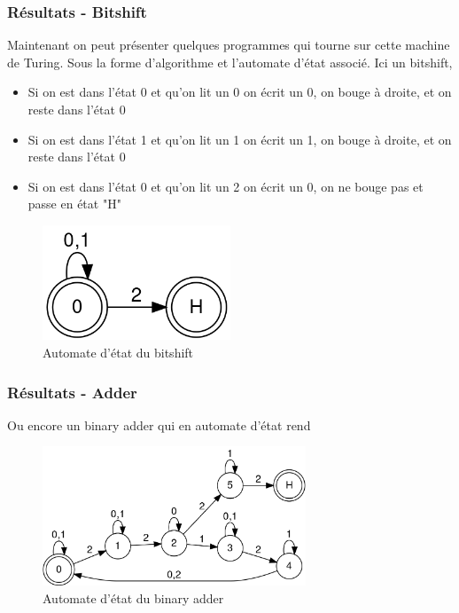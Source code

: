 \documentclass{beamer}
\begin{document}
    \begin{frame}
        \frametitle{Résultats - Bitshift}
        Maintenant on peut présenter quelques programmes qui tourne sur cette machine de Turing. Sous la forme d'algorithme et l'automate 
        d'état associé. Ici un bitshift,
        \begin{itemize}
            \item<1> Si on est dans l'état 0 et qu'on lit un 0 on écrit un 0, on bouge à droite, et on reste dans l'état 0
            \item<2> Si on est dans l'état 1 et qu'on lit un 1 on écrit un 1, on bouge à droite, et on reste dans l'état 0
            \item<3> Si on est dans l'état 0 et qu'on lit un 2 on écrit un 0, on ne bouge pas et passe en état "H"
        \end{itemize}
        \begin{figure}[H]
            \center
            \includegraphics[width=0.5\textwidth]{img/automata1.png}
            \caption{Automate d'état du bitshift}
        \end{figure}
    \end{frame}
    \begin{frame}
        \frametitle{Résultats - Adder}
        Ou encore un binary adder qui en automate d'état rend 
        \begin{figure}
            \center 
            \includegraphics[width=0.7\textwidth]{img/automata2.png}
            \caption{Automate d'état du binary adder}
        \end{figure}
    \end{frame}
\end{document}
